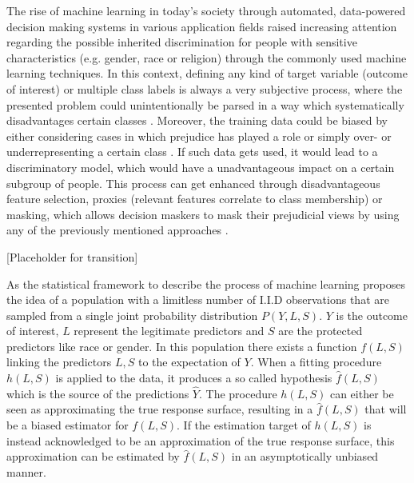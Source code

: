 The rise of machine learning in today's society through automated, data-powered decision making systems in various application fields raised increasing attention regarding the possible inherited discrimination for people with sensitive characteristics (e.g. gender, race or religion) through the commonly used machine learning techniques.
In this context, defining any kind of target variable (outcome of interest) or multiple class labels is always a very subjective process, where 
the presented problem could unintentionally be parsed in a way which systematically disadvantages 
certain classes \cite{Barocas.2016, barocas-hardt-narayanan}. Moreover, the training data could be biased by 
either considering cases in which prejudice has played a role or simply over- or underrepresenting 
a certain class \cite{Barocas.2016, barocas-hardt-narayanan}. If such data gets used, it would lead to a discriminatory model, which would have a unadvantageous impact on a certain subgroup of people. This process can get enhanced through disadvantageous feature selection, proxies (relevant features correlate to class membership) or masking, which allows decision maskers to mask their prejudicial views by using any of the previously mentioned approaches \cite{Barocas.2016, barocas-hardt-narayanan}.  

[Placeholder for transition]

As the statistical framework to describe the process of machine learning \cite{Berk.2018} 
proposes the idea of a population with a limitless number of I.I.D observations that are 
sampled from a single joint probability distribution $P(Y,L,S)$. 
$Y$ is the outcome of interest, $L$ represent the legitimate predictors and $S$ are the 
protected predictors like race or gender. In this population there exists a function $f(L,S)$ 
linking the predictors $L,S$ to the expectation of $Y$. When a fitting procedure $h(L,S)$ 
is applied to the data, it produces a so called hypothesis $\hat{f}(L,S)$ which is the 
source of the predictions $\hat{Y}$. The procedure $h(L,S)$ can either be seen as 
approximating the true response surface, resulting in a $\hat{f}(L,S)$ that will be a biased 
estimator for $f(L,S)$. If the estimation target of $h(L,S)$ is instead acknowledged to be 
an approximation of the true response surface, this approximation can be estimated by 
$\hat{f}(L,S)$ in an asymptotically unbiased manner.